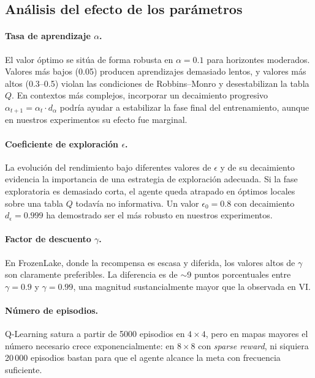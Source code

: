 \documentclass[11pt,a4paper]{article}
\begin{document}
\subsection{Análisis del efecto de los parámetros}

\paragraph{Tasa de aprendizaje $\alpha$.} El valor óptimo se sitúa de forma robusta en $\alpha=0.1$ para horizontes moderados. Valores más bajos (0.05) producen aprendizajes demasiado lentos, y valores más altos (0.3--0.5) violan las condiciones de Robbins--Monro y desestabilizan la tabla $Q$. En contextos más complejos, incorporar un decaimiento progresivo $\alpha_{t+1} = \alpha_t \cdot d_\alpha$ podría ayudar a estabilizar la fase final del entrenamiento, aunque en nuestros experimentos su efecto fue marginal.

\paragraph{Coeficiente de exploración $\epsilon$.} La evolución del rendimiento bajo diferentes valores de $\epsilon$ y de su decaimiento evidencia la importancia de una estrategia de exploración adecuada. Si la fase exploratoria es demasiado corta, el agente queda atrapado en óptimos locales sobre una tabla $Q$ todavía no informativa. Un valor $\epsilon_0=0.8$ con decaimiento $d_\epsilon=0.999$ ha demostrado ser el más robusto en nuestros experimentos.

\paragraph{Factor de descuento $\gamma$.} En FrozenLake, donde la recompensa es escasa y diferida, los valores altos de $\gamma$ son claramente preferibles. La diferencia es de $\sim$9 puntos porcentuales entre $\gamma=0.9$ y $\gamma=0.99$, una magnitud sustancialmente mayor que la observada en VI.

\paragraph{Número de episodios.} Q-Learning satura a partir de 5000 episodios en $4\times 4$, pero en mapas mayores el número necesario crece exponencialmente: en $8\times 8$ con \emph{sparse reward}, ni siquiera 20\,000 episodios bastan para que el agente alcance la meta con frecuencia suficiente.
\end{document}
